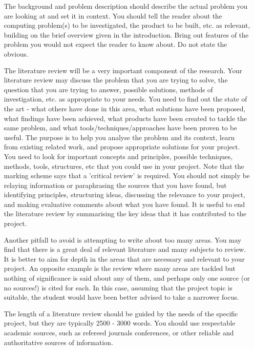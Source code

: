 {    The background and problem description should describe the actual problem you are looking at and set it in context. You should tell the reader about the computing problem(s)
    to be investigated, the product to be built, etc. as relevant, building on the brief overview given in the introduction. Bring out features of the problem you would not
    expect the reader to know about. Do not state the obvious.

    The literature review will be a very important component of the research. Your literature review may discuss the problem that you are trying to solve, the question that
    you are trying to answer, possible solutions, methods of investigation, etc. as appropriate to your needs. You need to find out the state of the art - what others have
    done in this area, what solutions have been proposed, what findings have been achieved, what products have been created to tackle the same problem, and what
    tools/techniques/approaches have been proven to be useful. The purpose is to help you analyse the problem and its context, learn from existing related work, and
    propose appropriate solutions for your project. You need to look for important concepts and principles, possible techniques, methods, tools, structures, etc that
    you could use in your project.
    Note that the marking scheme says that a 'critical review' is required. You should not simply be relaying information or paraphrasing the sources that you have found, but
    identifying principles, structuring ideas, discussing the relevance to your project, and making evaluative comments about what you have found. It is useful to end the
    literature review by summarising the key ideas that it has contributed to the project.

    Another pitfall to avoid is attempting to write about too many areas. You may find that there is a great deal of relevant literature and many subjects to review. It is
    better to aim for depth in the areas that are necessary and relevant to your project. An opposite example is the review where many areas are tackled but nothing
    of significance is said about any of them, and perhaps only one source (or no sources!) is cited for each. In this case, assuming that the project topic is suitable, the
    student would have been better advised to take a narrower focus.

    The length of a literature review should be guided by the needs of the specific project, but they are typically 2500 - 3000 words. You should use respectable academic sources,
    such as refereed journals conferences, or other reliable and authoritative sources of information.

}
